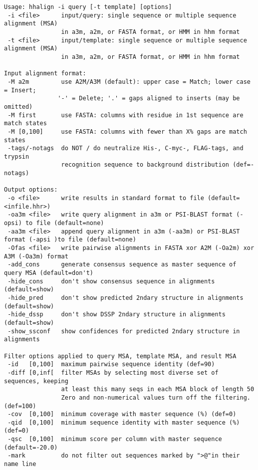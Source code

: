 \documentclass[11pt,a4paper]{article}
\begin{document}
\small 
\begin{verbatim}
Usage: hhalign -i query [-t template] [options]  
 -i <file>      input/query: single sequence or multiple sequence alignment (MSA)
                in a3m, a2m, or FASTA format, or HMM in hhm format
 -t <file>      input/template: single sequence or multiple sequence alignment (MSA)
                in a3m, a2m, or FASTA format, or HMM in hhm format

Input alignment format:                                                       
 -M a2m         use A2M/A3M (default): upper case = Match; lower case = Insert;
               '-' = Delete; '.' = gaps aligned to inserts (may be omitted)   
 -M first       use FASTA: columns with residue in 1st sequence are match states
 -M [0,100]     use FASTA: columns with fewer than X% gaps are match states   
 -tags/-notags  do NOT / do neutralize His-, C-myc-, FLAG-tags, and trypsin 
                recognition sequence to background distribution (def=-notags)  

Output options: 
 -o <file>      write results in standard format to file (default=<infile.hhr>)
 -oa3m <file>   write query alignment in a3m or PSI-BLAST format (-opsi) to file (default=none)
 -aa3m <file>   append query alignment in a3m (-aa3m) or PSI-BLAST format (-apsi )to file (default=none)
 -Ofas <file>   write pairwise alignments in FASTA xor A2M (-Oa2m) xor A3M (-Oa3m) format   
 -add_cons      generate consensus sequence as master sequence of query MSA (default=don't)
 -hide_cons     don't show consensus sequence in alignments (default=show)     
 -hide_pred     don't show predicted 2ndary structure in alignments (default=show)
 -hide_dssp     don't show DSSP 2ndary structure in alignments (default=show)  
 -show_ssconf   show confidences for predicted 2ndary structure in alignments

Filter options applied to query MSA, template MSA, and result MSA              
 -id   [0,100]  maximum pairwise sequence identity (def=90)
 -diff [0,inf[  filter MSAs by selecting most diverse set of sequences, keeping 
                at least this many seqs in each MSA block of length 50 
                Zero and non-numerical values turn off the filtering. (def=100) 
 -cov  [0,100]  minimum coverage with master sequence (%) (def=0)             
 -qid  [0,100]  minimum sequence identity with master sequence (%) (def=0)    
 -qsc  [0,100]  minimum score per column with master sequence (default=-20.0)    
 -mark          do not filter out sequences marked by ">@"in their name line  


\end{verbatim}
\end{document}
